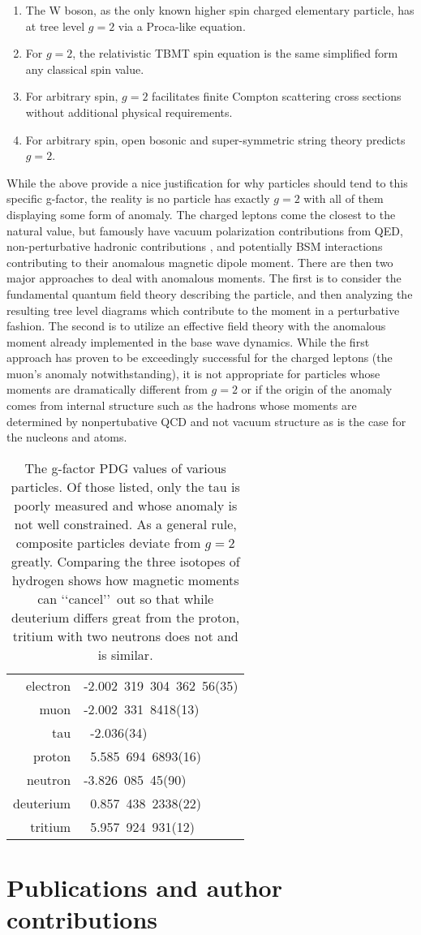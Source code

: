 \begin{enumerate}
	\item The W boson, as the only known higher spin charged elementary particle, has at tree level $g=2$ via a Proca-like equation.
	\item For $g=2$, the relativistic TBMT spin equation is the same simplified form any classical spin value.
	\item For arbitrary spin, $g=2$ facilitates finite Compton scattering cross sections without additional physical requirements.
	\item For arbitrary spin, open bosonic and super-symmetric string theory predicts $g=2$.
\end{enumerate}
While the above provide a nice justification for why particles should tend to this specific g-factor, the reality is no particle has exactly $g=2$ with all of them displaying some form of anomaly. The charged leptons come the closest to the natural value, but famously have vacuum polarization contributions \cite{Schwinger:1951nm} from QED, non-perturbative hadronic contributions \cite{Jegerlehner:2001wq,Jegerlehner:2017gek}, and potentially BSM interactions \cite{Czarnecki:2001pv,Knecht:2004,Jegerlehner:2009ry} contributing to their anomalous magnetic dipole moment. There are then two major approaches to deal with anomalous moments. The first is to consider the fundamental quantum field theory describing the particle, and then analyzing the resulting tree level diagrams which contribute to the moment in a perturbative fashion. The second is to utilize an effective field theory with the anomalous moment already implemented in the base wave dynamics. While the first approach has proven to be exceedingly successful for the charged leptons (the muon's anomaly notwithstanding), it is not appropriate for particles whose moments are dramatically different from $g=2$ or if the origin of the anomaly comes from internal structure such as the hadrons whose moments are determined by nonpertubative QCD \cite{Eichmann:2016yit,Pacetti:2014jai} and not vacuum structure as is the case for the nucleons and atoms.

\begin{table}
	\centering
\begin{tabular}{|r|l|}
	electron & -2.002\ 319\ 304\ 362\ 56(35)\\
	muon & -2.002\ 331\ 8418(13)\\
	tau & \ -2.036(34)\\
	proton & \ 5.585\ 694\ 6893(16)\\
	neutron & -3.826\ 085\ 45(90)\\
	deuterium & \ 0.857\ 438\ 2338(22)\\
	tritium & \ 5.957\ 924\ 931(12)
\end{tabular}
	\caption{The g-factor PDG values of various particles. Of those listed, only the tau is poorly measured and whose anomaly is not well constrained. As a general rule, composite particles deviate from $g=2$ greatly. Comparing the three isotopes of hydrogen shows how magnetic moments can \lq\lq cancel\rq\rq\ out so that while deuterium differs great from the proton, tritium with two neutrons does not and is similar.}
	\label{ajs:table:01}
\end{table}

\section{Publications and author contributions}
\label{sec:pubs}
